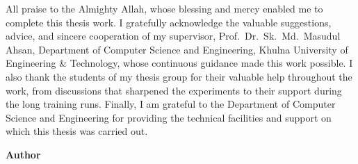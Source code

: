 
All praise to the Almighty Allah, whose blessing and mercy enabled me to
complete this thesis work. I gratefully acknowledge the valuable suggestions,
advice, and sincere cooperation of my supervisor,
Prof.\ Dr.\ Sk.\ Md.\ Masudul Ahsan, Department of Computer Science and
Engineering, Khulna University of Engineering \& Technology, whose continuous
guidance made this work possible. I also thank the students of my thesis
group for their valuable help throughout the work, from discussions that
sharpened the experiments to their support during the long training runs.
Finally, I am grateful to the Department of Computer Science and Engineering
for providing the technical facilities and support on which this thesis was
carried out.

\vspace{2\baselineskip}
\begin{flushright}
\textbf{Author}
\end{flushright}
\clearpage
